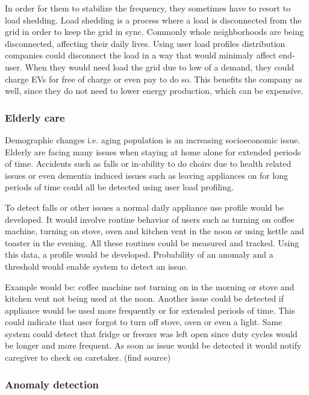 \documentclass[
11pt, %
english, %
singlespacing, %
headsepline, %
]{MastersDoctoralThesis} %
\begin{document}
In order for them to stabilize the frequency, they sometimes have to resort to load shedding.
Load shedding is a process where a load is disconnected from the grid in order to keep the grid in sync.
Commonly whole neighborhoods are being disconnected, affecting their daily lives.
Using user load profiles distribution companies could disconnect the load in a way that would minimaly affect end-user. 
When they would need load the grid due to low of a demand, they could charge EVs for free of charge or even pay to do so. 
This benefits the company as well, since they do not need to lower energy production, which can be expensive. 

\subsubsection{Elderly care}

Demographic changes i.e. aging population is an increasing socioeconomic issue.
Elderly are facing many issues when staying at home alone for extended periods of time.
Accidents such as falls or in-ability to do choirs due to health related issues or even dementia induced issues 
such as leaving appliances on for long periods of time could all be detected using user load profiling.

To detect falls or other issues a normal daily appliance use profile would be developed.
It would involve routine behavior of users such as turning on coffee machine, turning on stove, oven and kitchen vent in the noon or using kettle and toaster in the evening.
All these routines could be measured and tracked. Using this data, a profile would be developed.
Probability of an anomaly and a threshold would enable system to detect an issue.

Example would be: coffee machine not turning on in the morning or stove and kitchen vent not being used at the noon.
Another issue could be detected if appliance would be used more frequently or for extended periods of time. 
This could indicate that user forgot to turn off stove, oven or even a light. Same system could detect 
that fridge or freezer was left open since duty cycles would be longer and more frequent. 
As soon as issue would be detected it would notify caregiver to check on caretaker. (find source)


\subsubsection{Anomaly detection}
\end{document}
